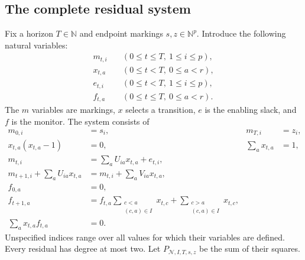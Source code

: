 \documentclass[11pt,a4paper]{article}
\theoremstyle{definition}
\theoremstyle{remark}
\newcommand{\N}{\mathbb N}
\begin{document}
\subsection{The complete residual system}
Fix a horizon $T\in\N$ and endpoint markings $s,z\in\N^p$. Introduce the following natural variables:
\begin{align*}
 m_{t,i}&\quad(0\leq t\leq T,\ 1\leq i\leq p),\\
 x_{t,a}&\quad(0\leq t<T,\ 0\leq a<r),\\
 e_{t,i}&\quad(0\leq t<T,\ 1\leq i\leq p),\\
 f_{t,a}&\quad(0\leq t\leq T,\ 0\leq a<r).
\end{align*}
The $m$ variables are markings, $x$ selects a transition, $e$ is the enabling slack, and $f$ is the monitor. The system consists of
\begin{align}
 m_{0,i}&=s_i,&m_{T,i}&=z_i,\label{cdc:wf:eq:petri-end}\\
 x_{t,a}(x_{t,a}-1)&=0,&\sum_a x_{t,a}&=1,\label{cdc:wf:eq:petri-onehot}\\
 m_{t,i}&=\sum_a U_{ia}x_{t,a}+e_{t,i},\label{cdc:wf:eq:petri-enable}\\
 m_{t+1,i}+\sum_a U_{ia}x_{t,a}
 &=m_{t,i}+\sum_a V_{ia}x_{t,a},\label{cdc:wf:eq:petri-update}\\
 f_{0,a}&=0,\label{cdc:wf:eq:petri-f0}\\
 f_{t+1,a}&=f_{t,a}\sum_{\substack{c<a\\(c,a)\in I}}x_{t,c}
 +\sum_{\substack{c>a\\(c,a)\in I}}x_{t,c},\label{cdc:wf:eq:petri-fupdate}\\
 \sum_a x_{t,a}f_{t,a}&=0.\label{cdc:wf:eq:petri-normal}
\end{align}
Unspecified indices range over all values for which their variables are defined. Every residual has degree at most two. Let $P_{\mathcal N,I,T,s,z}$ be the sum of their squares.
\end{document}
